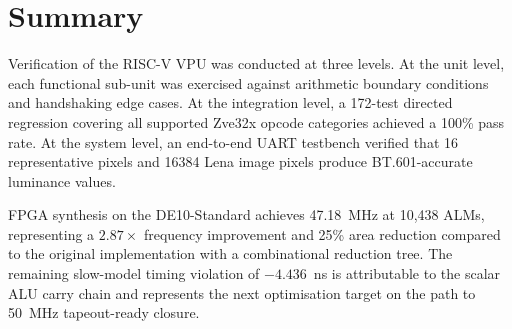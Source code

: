 \section{Summary}
\label{sec:eval_summary}

Verification of the RISC-V VPU was conducted at three levels. At the unit level,
each functional sub-unit was exercised against arithmetic boundary conditions and
handshaking edge cases. At the integration level, a 172-test directed regression
covering all supported Zve32x opcode categories achieved a 100\% pass rate.
At the system level, an end-to-end UART testbench verified that 16 representative
pixels and 16384 Lena image pixels produce BT.601-accurate luminance values.

FPGA synthesis on the DE10-Standard achieves 47.18~MHz at 10,438 ALMs, representing
a $2.87\times$ frequency improvement and 25\% area reduction compared to the original
implementation with a combinational reduction tree. The remaining slow-model timing
violation of $-4.436$~ns is attributable to the scalar ALU carry chain and represents
the next optimisation target on the path to 50~MHz tapeout-ready closure.
